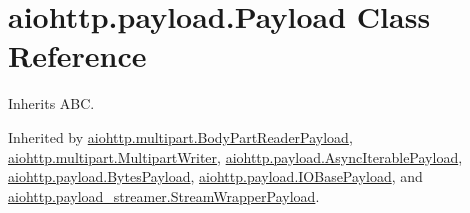 \hypertarget{classaiohttp_1_1payload_1_1_payload}{}\section{aiohttp.\+payload.\+Payload Class Reference}
\label{classaiohttp_1_1payload_1_1_payload}


Inherits A\+BC.



Inherited by \hyperlink{classaiohttp_1_1multipart_1_1_body_part_reader_payload}{aiohttp.\+multipart.\+Body\+Part\+Reader\+Payload}, \hyperlink{classaiohttp_1_1multipart_1_1_multipart_writer}{aiohttp.\+multipart.\+Multipart\+Writer}, \hyperlink{classaiohttp_1_1payload_1_1_async_iterable_payload}{aiohttp.\+payload.\+Async\+Iterable\+Payload}, \hyperlink{classaiohttp_1_1payload_1_1_bytes_payload}{aiohttp.\+payload.\+Bytes\+Payload}, \hyperlink{classaiohttp_1_1payload_1_1_i_o_base_payload}{aiohttp.\+payload.\+I\+O\+Base\+Payload}, and \hyperlink{classaiohttp_1_1payload__streamer_1_1_stream_wrapper_payload}{aiohttp.\+payload\+\_\+streamer.\+Stream\+Wrapper\+Payload}.

